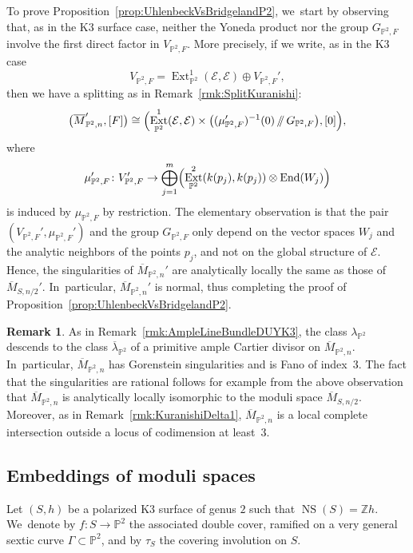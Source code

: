 \documentclass[11pt]{article}
\providecommand\sslash{\mathop{/\mkern-5.5mu/}}
\newcommand{\PP}{{\mathbb P}}\let\P\PP
\newcommand{\ZZ}{{\mathbb Z}}\let\Z\ZZ
\newcommand\cE{\mathcal{E}}
\DeclareMathOperator{\End}{End}
\DeclareMathOperator{\Ext}{Ext}
\DeclareMathOperator{\NS}{NS}
\theoremstyle{definition}
\newtheorem{rema}[lemm]{Remark}
\begin{document}
To prove Proposition~\ref{prop:UhlenbeckVsBridgelandP2}, we~start by observing that, as in the K3 surface case, neither the Yoneda product nor the group $G_{\P^2,F}$ involve the first direct factor in $V_{\PP^2,F}$.
More precisely, if we write, as in the K3 case
\[
V_{\PP^2,F} = \Ext^1_{\PP^2}(\cE,\cE) \oplus V_{\PP^2,F}',
\]
then we have a splitting as in Remark~\ref{rmk:SplitKuranishi}:
\begin{equation*}\label{eq:SplittingP2}
\bigl(\overline{M}_{\PP^2,n}',[F]\bigr)\cong \Bigl(\Ext^1_{\PP^2}(\cE,\cE) \times \bigl((\mu_{\PP^2,F}')^{-1}(0)\sslash G_{\P^2,F}\bigr),[0]\Bigr),
\end{equation*}
where
\[
\mu_{\PP^2,F}'\colon V_{\PP^2,F}'\to \bigoplus_{j=1}^m \Bigl(\Ext^2_{\PP^2}(k(p_j),k(p_j))\otimes \End(W_j) \Bigr)
\]
is induced by $\mu_{\PP^2,F}$ by restriction.
The elementary observation is that the pair $(V_{\PP^2,F}',\mu_{\PP^2,F}')$ and the group $G_{\P^2,F}$ only depend on the vector spaces $W_j$ and the analytic neighbors of the points $p_j$, and not on the global structure of $\cE$.
Hence, the singularities of $\overline{M}_{\PP^2,n}'$ are analytically locally the same as those of $\overline{M}_{S,n/2}'$. In~particular, $\overline{M}_{\PP^2,n}'$ is normal, thus completing the proof of Proposition~\ref{prop:UhlenbeckVsBridgelandP2}.

\begin{rema}\label{rmk:AmpleLineBundleDUYP2}
As in Remark~\ref{rmk:AmpleLineBundleDUYK3}, the class $\lambda_{\PP^2}$ descends to the class $\overline{\lambda}{}_{\PP^2}$ of a primitive ample Cartier divisor on $\overline{M}_{\PP^2,n}$. In~particular, $\overline{M}_{\PP^2,n}$ has Gorenstein singularities and is Fano of index~3.
The fact that the singularities are rational follows for example from the above observation that $\overline{M}_{\PP^2,n}$ is analytically locally isomorphic to the moduli space $\overline{M}_{S,n/2}$.
Moreover, as in Remark~\ref{rmk:KuranishiDelta1}, $\overline{M}_{\PP^2,n}$ is a local complete intersection outside a locus of codimension at least~3. \end{rema}

\subsection{Embeddings of moduli spaces}\label{subsec:EmbeddingsModuliSpaces}

Let $(S,h)$ be a polarized K3 surface of genus $2$ such that $\NS(S)=\ZZ h$. We~denote by $f\colon S \to \P^2$ the associated double cover, ramified on a very general sextic curve $\mathsf{\Gamma}\subset \PP^2$, and by $\tau_S$ the covering involution on $S$.
\end{document}
